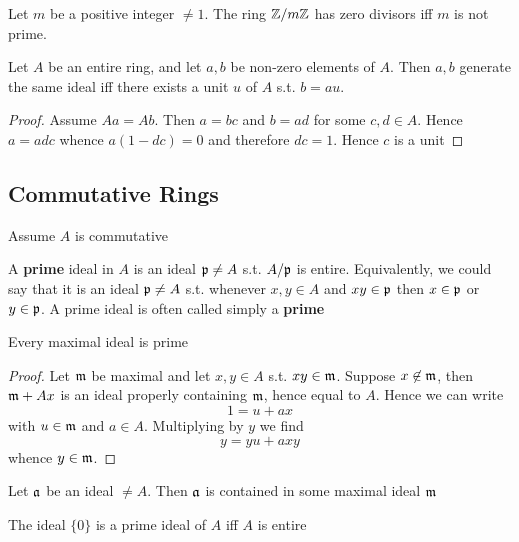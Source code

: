 \documentclass[11pt]{article}
\begin{document}
Let \(m\) be a positive integer \(\neq 1\). The ring \(\mathbb{Z}/m\mathbb{Z}\) has zero divisors iff \(m\) is not
prime.

\begin{proposition}[]
Let \(A\) be an entire ring, and let \(a,b\) be non-zero elements of \(A\). Then \(a,b\) generate
the same ideal iff there exists a unit \(u\) of \(A\) s.t. \(b=au\).
\end{proposition}

\begin{proof}
Assume \(Aa=Ab\). Then \(a=bc\) and \(b=ad\) for some \(c,d\in A\). Hence \(a=adc\)
whence \(a(1-dc)=0\) and therefore \(dc=1\). Hence \(c\) is a unit
\end{proof}

\subsection{Commutative Rings}
\label{sec:org62dccf9}
Assume \(A\) is commutative

A \textbf{prime} ideal in \(A\) is an ideal \(\mathfrak{p}\neq A\) s.t. \(A/\mathfrak{p}\) is entire. Equivalently, we could say
that it is an ideal \(\mathfrak{p}\neq A\) s.t. whenever \(x,y\in A\) and \(xy\in\mathfrak{p}\) then \(x\in\mathfrak{p}\) or \(y\in\mathfrak{p}\). A
prime ideal is often called simply a \textbf{prime}

\begin{proposition}[]
Every maximal ideal is prime
\end{proposition}

\begin{proof}
Let \(\mathfrak{m}\) be maximal and let \(x,y\in A\) s.t. \(xy\in\mathfrak{m}\). Suppose \(x\not\in\mathfrak{m}\), then \(\mathfrak{m}+Ax\) is an
ideal properly containing \(\mathfrak{m}\), hence equal to \(A\). Hence we can write
\begin{equation*}
1=u+ax
\end{equation*}
with \(u\in\mathfrak{m}\) and \(a\in A\). Multiplying by \(y\) we find
\begin{equation*}
y=yu+axy
\end{equation*}
whence \(y\in\mathfrak{m}\).
\end{proof}

\begin{proposition}[]
Let \(\mathfrak{a}\) be an ideal \(\neq A\). Then \(\mathfrak{a}\) is contained in some maximal ideal \(\mathfrak{m}\)
\end{proposition}

\begin{proposition}[]
The ideal \(\{0\}\) is a prime ideal of \(A\) iff \(A\) is entire
\end{proposition}
\end{document}
